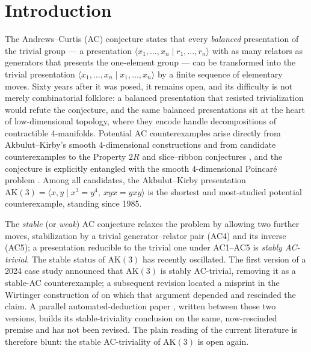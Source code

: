 \section{Introduction}\label{sec:intro}

The Andrews--Curtis (AC) conjecture \cite{andrews1965ac} states that every \emph{balanced}
presentation of the trivial group --- a presentation $\langle x_1,\dots,x_n \mid
r_1,\dots,r_n\rangle$ with as many relators as generators that presents the one-element
group --- can be transformed into the trivial presentation $\langle x_1,\dots,x_n \mid
x_1,\dots,x_n\rangle$ by a finite sequence of elementary moves. Sixty years after it was
posed, it remains open, and its difficulty is not merely combinatorial folklore: a
balanced presentation that resisted trivialization would refute the conjecture, and the
same balanced presentations sit at the heart of low-dimensional topology, where they
encode handle decompositions of contractible $4$-manifolds. Potential AC counterexamples
arise directly from Akbulut--Kirby's smooth $4$-dimensional constructions
\cite{akbulut1985ac} and from candidate counterexamples to the Property $2R$ and
slice--ribbon conjectures \cite{gompf2010fibered}, and the conjecture is explicitly
entangled with the smooth $4$-dimensional Poincar\'e problem \cite{freedman2010poincare}.
Among all candidates, the Akbulut--Kirby presentation $\mathrm{AK}(3) = \langle x,y \mid
x^{3}=y^{4},\ xyx=yxy\rangle$ is the shortest and most-studied potential counterexample,
standing since 1985.

The \emph{stable} (or \emph{weak}) AC conjecture relaxes the problem by allowing two
further moves, stabilization by a trivial generator--relator pair (AC4) and its inverse
(AC5); a presentation reducible to the trivial one under AC1--AC5 is \emph{stably
AC-trivial}. The stable status of $\mathrm{AK}(3)$ has recently oscillated. The first
version of a 2024 case study \cite{shehper2024hard} announced that $\mathrm{AK}(3)$ is
stably AC-trivial, removing it as a stable-AC counterexample; a subsequent revision
located a misprint in the Wirtinger construction of \cite{myasnikov2002ac} on which that
argument depended and rescinded the claim. A parallel automated-deduction paper
\cite{lisitsa2025ak3}, written between those two versions, builds its stable-triviality
conclusion on the same, now-rescinded premise and has not been revised. The plain reading
of the current literature is therefore blunt: the stable AC-triviality of $\mathrm{AK}(3)$
is open again.

